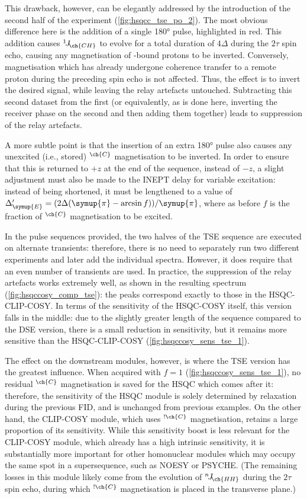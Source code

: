 \documentclass[a4paper,12pt]{article}
\newcommand{\carbon}{\ch{^{13}C}}
\newcommand{\DeltaE}{\Delta_{\symup{E}}}
\newcommand{\magn}[1]{\ch{^1H}$^{\ch{#1}}$}
\newcommand{\magnnot}[1]{\ch{^1H}$^{!\ch{#1}}$}
\newcommand{\oneJ}[1]{{}^{1}\!J_{\!\ch{#1}}}
\newcommand{\nJ}[1]{{}^{n}\!J_{\!\ch{#1}}}
\newcommand{\cpi}{\symup{\pi}}
\begin{document}
\begin{refsection}
This drawback, however, can be elegantly addressed by the introduction of the second half of the experiment (\cref{fig:hsqcc_tse_po_2}).
The most obvious difference here is the addition of a single \carbon{} \ang{180} pulse, highlighted in red.
This addition causes $\oneJ{CH}$ to evolve for a total duration of $4\Delta$ during the $2\tau$ spin echo, causing any magnetisation of \carbon{}-bound protons to be inverted.
Conversely, magnetisation which has already undergone coherence transfer to a remote proton during the preceding spin echo is not affected.
Thus, the effect is to invert the desired signal, while leaving the relay artefacts untouched.
Subtracting this second dataset from the first (or equivalently, as is done here, inverting the receiver phase on the second and then adding them together) leads to suppression of the relay artefacts.

A more subtle point is that the insertion of an extra \carbon{} \ang{180} pulse also causes any unexcited (i.e., stored) \magn{C} magnetisation to be inverted.
In order to ensure that this is returned to $+z$ at the end of the sequence, instead of $-z$, a slight adjustment must also be made to the INEPT delay for variable excitation: instead of being shortened, it must be lengthened to a value of $\DeltaE' = (2\Delta (\cpi - \arcsin f))/\cpi$, where as before $f$ is the fraction of \magn{C} magnetisation to be excited.

In the pulse sequences provided, the two halves of the TSE sequence are executed on alternate transients: therefore, there is no need to separately run two different experiments and later add the individual spectra.
However, it does require that an even number of transients are used.
In practice, the suppression of the relay artefacts works extremely well, as shown in the resulting spectrum (\cref{fig:hsqccosy_comp_tse}): the peaks correspond exactly to those in the HSQC-CLIP-COSY.
In terms of the sensitivity of the HSQC-COSY itself, this version falls in the middle: due to the slightly greater length of the sequence compared to the DSE version, there is a small reduction in sensitivity, but it remains more sensitive than the HSQC-CLIP-COSY (\cref{fig:hsqccosy_sens_tse_1}).

The effect on the downstream modules, however, is where the TSE version has the greatest influence.
When acquired with $f = 1$ (\cref{fig:hsqccosy_sens_tse_1}), no residual \magn{C} magnetisation is saved for the HSQC which comes after it: therefore, the sensitivity of the HSQC module is solely determined by relaxation during the previous FID, and is unchanged from previous examples.
On the other hand, the CLIP-COSY module, which uses \magnnot{C} magnetisation, retains a large proportion of its sensitivity.
While this sensitivity boost is less relevant for the CLIP-COSY module, which already has a high intrinsic sensitivity, it is substantially more important for other homonuclear modules which may occupy the same spot in a supersequence, such as NOESY or PSYCHE.
(The remaining losses in this module likely come from the evolution of $\nJ{HH}$ during the $2\tau$ spin echo, during which \magnnot{C} magnetisation is placed in the transverse plane.)


\end{refsection}
\end{document}
